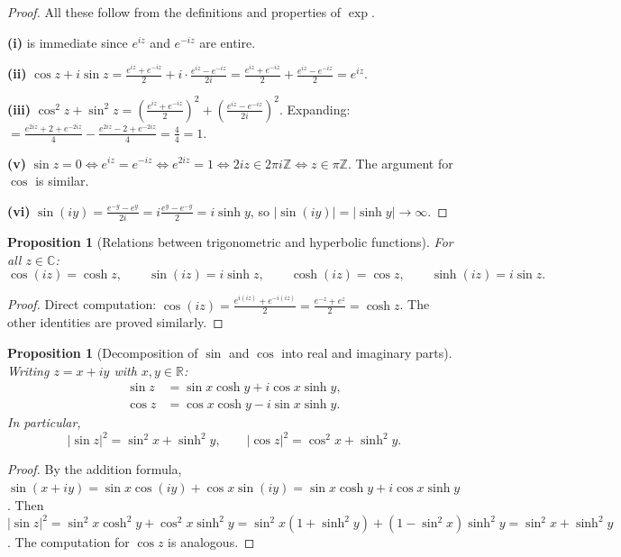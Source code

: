 \documentclass[12pt,a4paper,openany]{book}
\theoremstyle{definition}
\theoremstyle{plain}
\newtheorem{proposition}[definition]{Proposition}
\theoremstyle{remark}
\newcommand{\C}{\mathbb{C}}
\newcommand{\R}{\mathbb{R}}
\newcommand{\Z}{\mathbb{Z}}
\newcommand{\abs}[1]{\left|#1\right|}
\begin{document}
\begin{proof}
All these follow from the definitions and properties of $\exp$.

\textbf{(i)} is immediate since $e^{iz}$ and $e^{-iz}$ are entire.

\textbf{(ii)} $\cos z + i\sin z = \frac{e^{iz}+e^{-iz}}{2}
+ i\cdot\frac{e^{iz}-e^{-iz}}{2i} = \frac{e^{iz}+e^{-iz}}{2}
+ \frac{e^{iz}-e^{-iz}}{2} = e^{iz}$.

\textbf{(iii)} $\cos^2 z + \sin^2 z
= \left(\frac{e^{iz}+e^{-iz}}{2}\right)^{\!2}
+ \left(\frac{e^{iz}-e^{-iz}}{2i}\right)^{\!2}$.
Expanding: $= \frac{e^{2iz}+2+e^{-2iz}}{4} - \frac{e^{2iz}-2+e^{-2iz}}{4}
= \frac{4}{4} = 1$.

\textbf{(v)} $\sin z = 0 \iff e^{iz} = e^{-iz} \iff e^{2iz} = 1
\iff 2iz \in 2\pi i\Z \iff z\in\pi\Z$.  The argument for $\cos$ is similar.

\textbf{(vi)} $\sin(iy) = \frac{e^{-y}-e^{y}}{2i} = i\frac{e^{y}-e^{-y}}{2}
= i\sinh y$, so $\abs{\sin(iy)}=\abs{\sinh y}\to\infty$.
\end{proof}

\begin{proposition}[Relations between trigonometric and hyperbolic functions]%
\label{prop:trig-hyp-relation}
For all $z\in\C$:
\[
  \cos(iz) = \cosh z, \qquad \sin(iz) = i\sinh z, \qquad
  \cosh(iz) = \cos z, \qquad \sinh(iz) = i\sin z.
\]
\end{proposition}

\begin{proof}
Direct computation: $\cos(iz) = \frac{e^{i(iz)}+e^{-i(iz)}}{2}
= \frac{e^{-z}+e^{z}}{2} = \cosh z$.  The other identities are proved
similarly.
\end{proof}

\begin{proposition}[Decomposition of $\sin$ and $\cos$ into real and imaginary parts]%
\label{prop:trig-real-imag}
Writing $z = x+iy$ with $x,y\in\R$:
\begin{align*}
  \sin z &= \sin x\cosh y + i\cos x\sinh y, \\
  \cos z &= \cos x\cosh y - i\sin x\sinh y.
\end{align*}
In particular,
\[
  \abs{\sin z}^2 = \sin^2 x + \sinh^2 y, \qquad
  \abs{\cos z}^2 = \cos^2 x + \sinh^2 y.
\]
\end{proposition}

\begin{proof}
By the addition formula,
$\sin(x+iy) = \sin x\cos(iy) + \cos x\sin(iy) = \sin x\cosh y + i\cos x\sinh y$.
Then $\abs{\sin z}^2 = \sin^2 x\cosh^2 y + \cos^2 x\sinh^2 y
= \sin^2 x(1+\sinh^2 y) + (1-\sin^2 x)\sinh^2 y = \sin^2 x + \sinh^2 y$.
The computation for $\cos z$ is analogous.
\end{proof}
\end{document}
